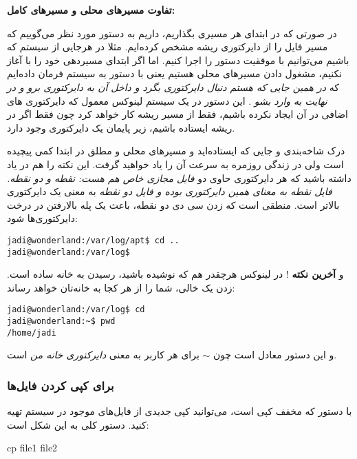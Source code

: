 \textbf{تفاوت مسیرهای محلی و مسیرهای کامل:}

در صورتی که در ابتدای هر مسیری \lr{/} بگذاریم، داریم به دستور مورد نظر می‌گوییم که مسیر فایل را از دایرکتوری ریشه مشخص کرده‌ایم. مثلا در هرجایی از سیستم که باشیم می‌توانیم با موفقیت دستور
را اجرا کنیم. 
اما اگر ابتدای مسیردهی خود را با 
\lr{/}
آغاز نکنیم، مشغول دادن مسیرهای محلی هستیم یعنی با دستور
به سیستم فرمان داده‌ایم که
\emph{در همین جایی که هستم دنبال دایرکتوری 
 بگرد و داخل آن به دایرکتوری 
 برو و در نهایت به 
 وارد بشو}
. این دستور در یک سیستم لینوکس معمول که دایرکتوری های اضافی در آن ایجاد نکرده باشیم، فقط از مسیر ریشه کار خواهد کرد چون فقط اگر در ریشه ایستاده باشیم، زیر پایمان یک دایرکتوری 
 وجود دارد.
 
درک شاخه‌بندی و جایی که ایستاده‌اید و مسیرهای محلی و مطلق در ابتدا کمی پیچیده است ولی در زندگی روزمره به سرعت آن را یاد خواهید گرفت. این نکته را هم در یاد داشته باشید که هر دایرکتوری حاوی دو
\emph{فایل مجازی خاص هم هست: نقطه و دو نقطه. فایل نقطه به معنای همین دایرکتوری بوده و فایل دو نقطه}
به معنی یک دایرکتوری بالاتر است. منطقی است که زدن سی دی دو نقطه، باعث یک پله بالارفتن در درخت دایرکتوری‌ها شود:
\begin{frameng}
\begin{lstlisting}
jadi@wonderland:/var/log/apt$ cd ..
jadi@wonderland:/var/log$ 
\end{lstlisting}
\end{frameng}

و
\textbf{آخرین نکته}
‌! در لینوکس هرچقدر هم که نوشیده باشید، رسیدن به خانه ساده است. زدن یک  خالی، شما را از هر کجا به خانه‌تان خواهد رساند:
\begin{frameng}
\begin{lstlisting}
jadi@wonderland:/var/log$ cd
jadi@wonderland:~$ pwd
/home/jadi
\end{lstlisting}
\end{frameng}

و این دستور معادل
است چون $\sim$ برای هر کاربر به معنی
\emph{دایرکتوری خانه من}
است.
\subsubsection*{ برای کپی کردن فایل‌ها}
با دستور  که مخفف کپی است، می‌توانید کپی جدیدی از فایل‌های موجود در سیستم تهیه کنید. دستور کلی به این شکل است:
\begin{frameng}
cp file1 file2
\end{frameng}

